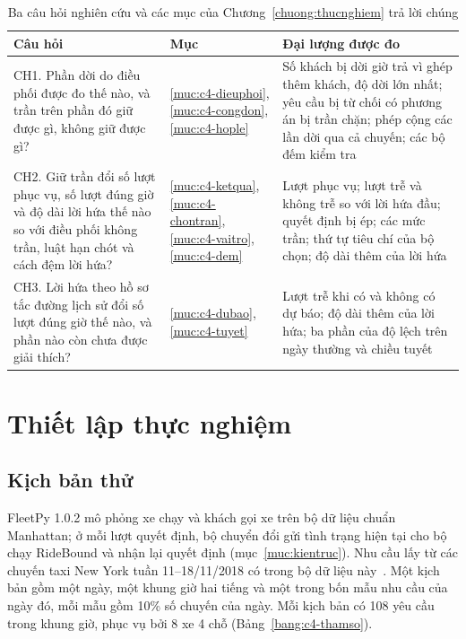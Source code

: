 \begin{table}[htbp]
\centering
\caption{Ba câu hỏi nghiên cứu và các mục của Chương~\ref{chuong:thucnghiem} trả lời chúng}
\label{bang:c4-lotrinh}
\small
\begin{tabular}{@{}p{6.3cm}p{2.4cm}p{6.3cm}@{}}
\toprule
\textbf{Câu hỏi} & \textbf{Mục} & \textbf{Đại lượng được đo}\\
\midrule
CH1. Phần dời do điều phối được đo thế nào, và trần trên phần đó giữ được gì, không giữ được gì?
& \ref{muc:c4-dieuphoi}, \ref{muc:c4-congdon}, \ref{muc:c4-hople}
& Số khách bị dời giờ trả vì ghép thêm khách, độ dời lớn nhất; yêu cầu bị từ chối có phương án bị trần chặn;
phép cộng các lần dời qua cả chuyến; các bộ đếm kiểm tra\\
CH2. Giữ trần đổi số lượt phục vụ, số lượt đúng giờ và độ dài lời hứa thế nào so với điều phối không
trần, luật hạn chót và cách đệm lời hứa?
& \ref{muc:c4-ketqua}, \ref{muc:c4-chontran}, \ref{muc:c4-vaitro}, \ref{muc:c4-dem}
& Lượt phục vụ; lượt trễ và không trễ so với lời hứa đầu; quyết định bị ép; các mức trần; thứ tự tiêu chí
của bộ chọn; độ dài thêm của lời hứa\\
CH3. Lời hứa theo hồ sơ tắc đường lịch sử đổi số lượt đúng giờ thế nào, và phần nào còn chưa được
giải thích?
& \ref{muc:c4-dubao}, \ref{muc:c4-tuyet}
& Lượt trễ khi có và không có dự báo; độ dài thêm của lời hứa; ba phần của độ lệch trên ngày thường và chiều
tuyết\\
\bottomrule
\end{tabular}
\end{table}

\section{Thiết lập thực nghiệm}
\label{muc:c4-thietlap}

\subsection{Kịch bản thử}
\label{muc:c4-kichban}

FleetPy 1.0.2 mô phỏng xe chạy và khách gọi xe trên bộ dữ liệu chuẩn Manhattan; ở mỗi lượt quyết định, bộ chuyển
đổi gửi tình trạng hiện tại cho bộ chạy RideBound và nhận lại quyết định (mục~\ref{muc:kientruc}). Nhu cầu lấy từ
các chuyến taxi New York tuần 11--18/11/2018 có trong bộ dữ liệu này~\cite{engelhardt2026}. Một kịch bản gồm một
ngày, một khung giờ hai tiếng và một trong bốn mẫu nhu cầu của ngày đó, mỗi mẫu gồm 10\% số chuyến của ngày. Mỗi kịch
bản có 108 yêu cầu trong khung giờ, phục vụ bởi 8 xe 4 chỗ (Bảng~\ref{bang:c4-thamso}).

